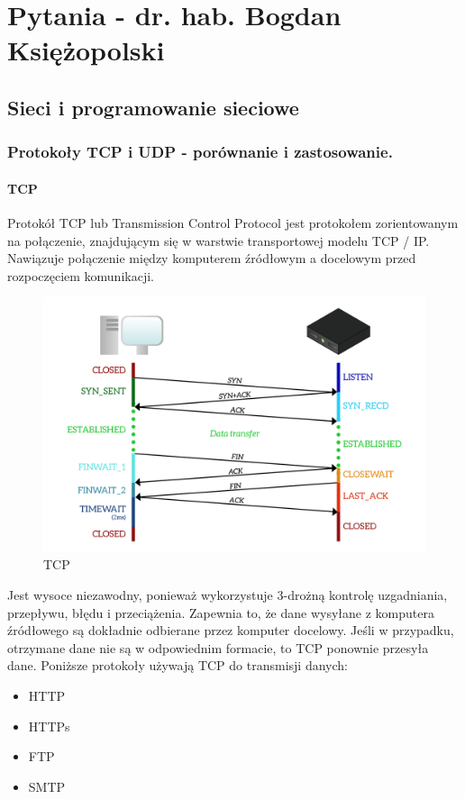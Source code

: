 \documentclass[a4paper,12pt,oneside]{book}
\begin{document}
	

	\tableofcontents
	\newpage
	
	\chapter{Pytania - dr. hab. Bogdan Księżopolski}
	
		\section{Sieci i programowanie sieciowe}
			\subsection{Protokoły TCP i UDP - porównanie i zastosowanie.}
			
				\subsubsection*{TCP}
				
				Protokół TCP lub Transmission Control Protocol jest protokołem zorientowanym na połączenie, znajdującym się w warstwie transportowej modelu TCP / IP. Nawiązuje połączenie między komputerem źródłowym a docelowym przed rozpoczęciem komunikacji.
				
				\begin{figure}[h!]
					\centering\includegraphics[scale=0.30]{tcp.png}
					\caption{TCP}
				\end{figure}
				
				Jest wysoce niezawodny, ponieważ wykorzystuje 3-drożną kontrolę uzgadniania, przepływu, błędu i przeciążenia. Zapewnia to, że dane wysyłane z komputera źródłowego są dokładnie odbierane przez komputer docelowy. Jeśli w przypadku, otrzymane dane nie są w odpowiednim formacie, to TCP ponownie przesyła dane.
				Poniższe protokoły używają TCP do transmisji danych:
				\begin{itemize}
					\item HTTP
					\item HTTPs
					\item FTP
					\item SMTP
				\end{itemize}
				
\end{document}
